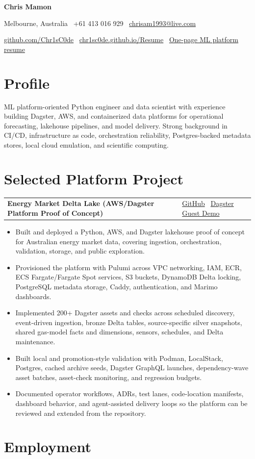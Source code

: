 \documentclass[10pt,a4paper]{article}
\makeatletter
\newcommand{\resumeheader}[4]{
  {\huge\textbf{\textcolor{textdark}{#1}}}\par
  \textcolor{mutedtext}{#2 \textbar\ #3 \textbar\ \href{mailto:#4}{#4}}\par
  \textcolor{mutedtext}{\href{https://github.com/Chr1sC0de/}{github.com/Chr1sC0de}
  \textbar\
  \href{https://chr1sc0de.github.io/Resume/}{chr1sc0de.github.io/Resume}
  \textbar\
  \href{platform-resume.pdf}{One-page ML platform resume}}\par
}
\newcommand{\resumesection}[1]{\section*{#1}}
\newcommand{\resumeproject}[2]{
  \par\addvspace{0.2em}
  \noindent\begin{tabularx}{\textwidth}{@{}>{\raggedright\arraybackslash}X>{\raggedleft\arraybackslash}p{0.36\textwidth}@{}}
    \textbf{\textcolor{textdark}{#1}} & #2
  \end{tabularx}
  \vspace{-0.55em}
}
\makeatother
\begin{document}
\resumeheader{Chris Mamon}{Melbourne, Australia}{+61 413 016 929}{chrisam1993@live.com}

\resumesection{Profile}
ML platform-oriented Python engineer and data scientist with experience building Dagster, AWS, and containerized data platforms for operational forecasting, lakehouse pipelines, and model delivery. Strong background in CI/CD, infrastructure as code, orchestration reliability, Postgres-backed metadata stores, local cloud emulation, and scientific computing.

\resumesection{Selected Platform Project}
\resumeproject{Energy Market Delta Lake (AWS/Dagster Platform Proof of Concept)}{\href{https://github.com/Chr1sC0de/energy-market-delta-lake}{GitHub} \textbar\ \href{https://ausenergymarketdata.com/dagster-webserver/guest}{Dagster Guest Demo}}
\begin{itemize}
  \item Built and deployed a Python, AWS, and Dagster lakehouse proof of concept for Australian energy market data, covering ingestion, orchestration, validation, storage, and public exploration.
  \item Provisioned the platform with Pulumi across VPC networking, IAM, ECR, ECS Fargate/Fargate Spot services, S3 buckets, DynamoDB Delta locking, PostgreSQL metadata storage, Caddy, authentication, and Marimo dashboards.
  \item Implemented 200+ Dagster assets and checks across scheduled discovery, event-driven ingestion, bronze Delta tables, source-specific silver snapshots, shared gas-model facts and dimensions, sensors, schedules, and Delta maintenance.
  \item Built local and promotion-style validation with Podman, LocalStack, Postgres, cached archive seeds, Dagster GraphQL launches, dependency-wave asset batches, asset-check monitoring, and regression budgets.
  \item Documented operator workflows, ADRs, test lanes, code-location manifests, dashboard behavior, and agent-assisted delivery loops so the platform can be reviewed and extended from the repository.
\end{itemize}

\resumesection{Employment}
\end{document}
